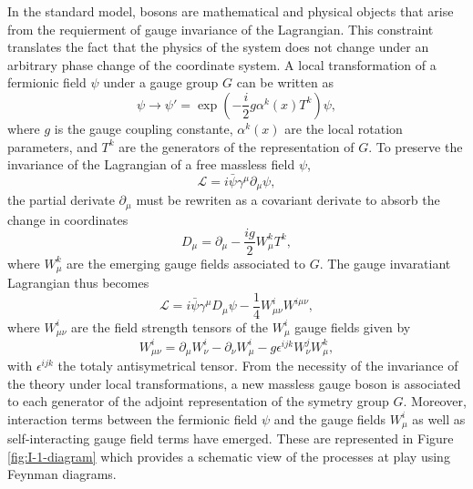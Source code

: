     In the standard model, bosons are mathematical and physical objects that arise from the requierment of gauge invariance of the Lagrangian. This constraint translates the fact that the physics of the system does not change under an arbitrary phase change of the coordinate system. A local transformation of a fermionic field $ \psi $ under a gauge group $ G $  can be written as
    \begin{equation}
      \psi \rightarrow \psi' = \exp\left(- \frac{i}{2} g \alpha^k(x) T^k \right) \psi ,
    \end{equation}
    where $ g $ is the gauge coupling constante, $ \alpha^k(x) $ are the local rotation parameters, and $ T^k $ are the generators of the representation of $ G $. To preserve the invariance of the Lagrangian of a free massless field $ \psi $,
    \begin{equation}
      \mathcal{L} = i \bar{\psi} \gamma^\mu \partial_\mu \psi ,
    \end{equation}
    the partial derivate $ \partial_\mu $ must be rewriten as a covariant derivate to absorb the change in coordinates
    \begin{equation}
      D_\mu = \partial_\mu - \frac{i g}{2} W^k_\mu T^k ,
    \end{equation}
    where $ W^k_\mu $ are the emerging gauge fields associated to $ G $. The gauge invaratiant Lagrangian thus becomes
    \begin{equation}
      \mathcal{L} = i \bar{\psi} \gamma^\mu D_\mu \psi - \frac{1}{4} W^i_{\mu \nu} W^{i \mu \nu} ,
    \end{equation}
    where $ W^i_{\mu \nu} $ are the field strength tensors of the $ W^i_\mu $ gauge fields given by
    \begin{equation}
      W^i_{\mu \nu} = \partial_\mu W^i_\nu - \partial_\nu W^i_\mu - g \epsilon^{ijk} W^j_\nu W^k_\mu ,
    \end{equation}
    with $ \epsilon^{ijk} $ the totaly antisymetrical tensor. From the necessity of the invariance of the theory under local transformations, a new massless gauge boson is associated to each generator of the adjoint representation of the symetry group $ G $. Moreover, interaction terms between the fermionic field $ \psi $ and the gauge fields $ W^i_\mu $ as well as self-interacting gauge field terms have emerged. These are represented in Figure \ref{fig:I-1-diagram} which provides a schematic view of the processes at play using Feynman diagrams.

